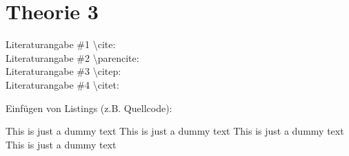\section{Theorie 3}
\label{sec:theorieC}

Literaturangabe \#1 \textbackslash cite: \cite{max2007company} \\
Literaturangabe \#2 \textbackslash parencite: \parencite{example2017sdk} \\
Literaturangabe \#3 \textbackslash citep: \citep{place2014art} \\
Literaturangabe \#4 \textbackslash citet: \citet{max2007company}

\bigskip

Einfügen von Listings (z.B. Quellcode):

\begin{center}
	\begin{minipage}[!H]{\textwidth}
		
	\end{minipage}
\end{center}
\bigskip

This is just a dummy text This is just a dummy text  This is just a dummy text This is just a dummy text 